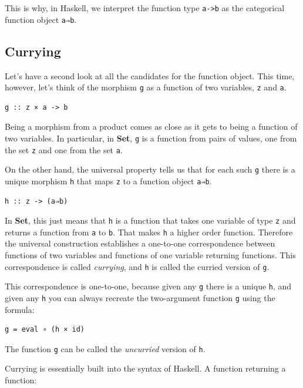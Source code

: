 This is why, in Haskell, we interpret the function type
\texttt{a-\textgreater{}b} as the categorical function object
\texttt{a⇒b}.

\subsection{Currying}\label{currying}

Let's have a second look at all the candidates for the function object.
This time, however, let's think of the morphism \texttt{g} as a function
of two variables, \texttt{z} and \texttt{a}.

\begin{verbatim}
g :: z × a -> b
\end{verbatim}

Being a morphism from a product comes as close as it gets to being a
function of two variables. In particular, in \textbf{Set}, \texttt{g} is
a function from pairs of values, one from the set \texttt{z} and one
from the set \texttt{a}.

On the other hand, the universal property tells us that for each such
\texttt{g} there is a unique morphism \texttt{h} that maps \texttt{z} to
a function object \texttt{a⇒b}.

\begin{verbatim}
h :: z -> (a⇒b)
\end{verbatim}

In \textbf{Set}, this just means that \texttt{h} is a function that
takes one variable of type \texttt{z} and returns a function from
\texttt{a} to \texttt{b}. That makes \texttt{h} a higher order function.
Therefore the universal construction establishes a one-to-one
correspondence between functions of two variables and functions of one
variable returning functions. This correspondence is called
\emph{currying}, and \texttt{h} is called the curried version of
\texttt{g}.

This correspondence is one-to-one, because given any \texttt{g} there is
a unique \texttt{h}, and given any \texttt{h} you can always recreate
the two-argument function \texttt{g} using the formula:

\begin{verbatim}
g = eval ∘ (h × id)
\end{verbatim}

The function \texttt{g} can be called the \emph{uncurried} version of
\texttt{h}.

Currying is essentially built into the syntax of Haskell. A function
returning a function:

